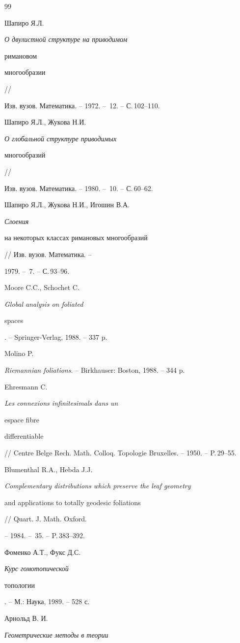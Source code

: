 \begin{thebibliography}{99}





 Шапиро Я.Л. {\it О двулистной структуре на приводимом


римановом


многообразии} //


Изв. вузов. Математика. -- 1972. -- \No\,12. -- С.\,102--110.




Шапиро Я.Л., Жукова Н.И. {\it  О глобальной структуре приводимых


многообразий} //


Изв. вузов. Математика. -- 1980. -- \No\,10. -- С.\,60--62.




Шапиро Я.Л., Жукова Н.И., Игошин В.А. {\it Слоения


на некоторых классах римановых многообразий} // Изв. вузов. Математика. --


1979. -- \No\,7. -- С.\,93--96.




Moore C.C., Schochet C. {\it Global analysis on foliated


spaces}. -- Springer-Verlag, 1988. -- 337 p.


 Molino P.


{\it Riemannian foliations}. -- Birkhauser: Boston, 1988. -- 344 p.




Ehresmann C. {\it Les connexions infinitesimals dans un


espace fibre


differentiable} // Centre Belge Rech. Math. Colloq. Topologie Bruxelles. -- 1950. -- P.\,29--55.


 Blumenthal R.A., Hebda J.J.


{\it Complementary distributions which preserve the leaf geometry


and applications to totally geodesic foliations} // Quart. J. Math. Oxford.


-- 1984. -- \No\,35. -- P.\,383--392.


  Фоменко А.Т., Фукс Д.С. {\it Курс гомотопической


топологии}. -- М.: Наука, 1989. -- 528 с.


 Арнольд В. И. {\it Геометрические методы в теории


}
\end{thebibliography}
